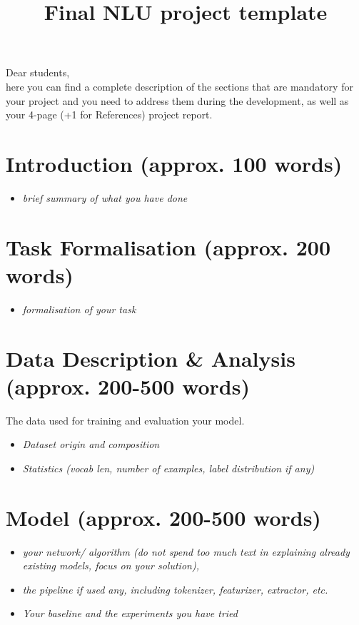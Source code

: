 \documentclass[a4paper]{article}
\title{Final NLU project template}
\begin{document}
\maketitle

Dear students, \\
here you can find a complete description of the sections that are mandatory for your project and you need to address them during the development, as well as your 4-page (+1 for References) project report.


\section{Introduction (approx. 100 words)}
\begin{itemize}
    \item \textit{brief  summary of what you have done}
\end{itemize}
\section{Task Formalisation (approx. 200 words)}
\begin{itemize}
    \item \textit{formalisation of your task}
\end{itemize}
\section{Data Description & Analysis (approx. 200-500 words)}
The data used for training and evaluation your model.
\begin{itemize}
    \item \textit{Dataset origin and composition}
    \item \textit{Statistics (vocab len, number of examples, label distribution if any)}
\end{itemize}
\section{Model (approx. 200-500 words)}
\begin{itemize}
    \item \textit{your network/ algorithm (do not spend too much text in explaining already existing models, focus on your solution),}
    \item \textit{the pipeline if used any, including  tokenizer, featurizer, extractor, etc.}
    \item \textit{Your baseline and the experiments you have tried}
\end{itemize}
 
\end{document}
